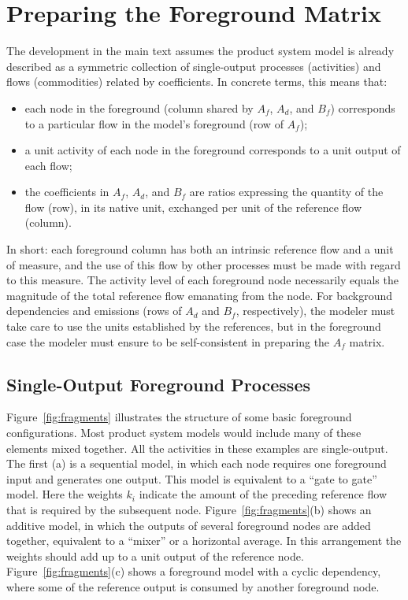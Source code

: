 \section{Preparing the Foreground Matrix}

The development in the main text assumes the product system model is already described as a symmetric collection of single-output processes (activities) and flows (commodities) related by coefficients.  In concrete terms, this means that:
\begin{itemize}
\item each node in the foreground (column shared by $A_f$, $A_d$, and $B_f$) corresponds to a particular flow in the model's foreground (row of $A_f$);
\item a unit activity of each node in the foreground corresponds to a unit output of each flow;
\item the coefficients in $A_f$, $A_d$, and $B_f$ are ratios expressing the quantity of the flow (row), in its native unit, exchanged per unit of the reference flow (column). 
\end{itemize}

In short: each foreground column has both an intrinsic reference flow and a unit of measure, and the use of this flow by other processes must be made with regard to this measure.  The activity level of each foreground node necessarily equals the magnitude of the total reference flow emanating from the node.  For background dependencies and emissions (rows of $A_d$ and $B_f$, respectively), the modeler must take care to use the units established by the references, but in the foreground case the modeler must ensure to be self-consistent in preparing the $A_f$ matrix. 


\subsection{Single-Output Foreground Processes}



Figure~\ref{fig:fragments} illustrates the structure of some basic foreground configurations.  Most product system models would include many of these elements mixed together.  All the activities in these examples are single-output.
The first (a) is a sequential model, in which each node requires one foreground input and generates one output. This model is equivalent to a ``gate to gate'' model.  Here the weights $k_i$ indicate the amount of the preceding reference flow that is required by the subsequent node.  Figure~\ref{fig:fragments}(b) shows an additive model, in which the outputs of several foreground nodes are added together, equivalent to a ``mixer'' or a horizontal average.  In this arrangement the weights %
should add up to a unit output of the reference node.  Figure~\ref{fig:fragments}(c) shows a foreground model with a cyclic dependency, where some of the reference output is consumed by another foreground node.

